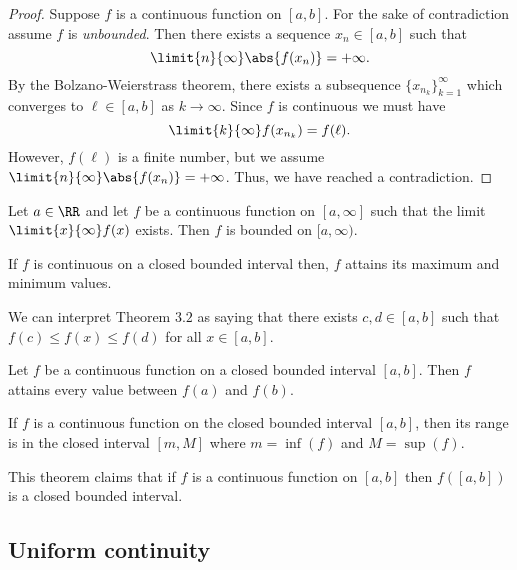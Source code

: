 \documentclass[12pt, a4paper]{article}
\begin{document}
\begin{proof}
    Suppose \(f\) is a continuous function on \([a,b]\). For the sake of contradiction assume \(f\) is \textit{unbounded}. Then there exists a sequence \(x_n \in [a,b]\) such that
    \[\limit{n}{\infty} \abs{f(x_n)} = +\infty.\]
    By the Bolzano-Weierstrass theorem, there exists a subsequence \(\{x_{n_k}\}_{k=1}^{\infty}\) which converges to \(\ell \in [a,b]\) as \(k \to \infty\). Since \(f\) is continuous we must have
    \[\limit{k}{\infty} f(x_{n_k}) =f(\ell).\]
    However, \(f(\ell)\) is a finite number, but we assume \(\limit{n}{\infty} \abs{f(x_n)} = +\infty\). Thus, we have reached a contradiction.
\end{proof}

\begin{mdcor}
    Let \(a \in \RR\) and let \(f\) be a continuous function on \([a,\infty]\) such that the limit \(\limit{x}{\infty} f(x)\) exists. Then \(f\) is bounded on \([a,\infty)\).
\end{mdcor}

\begin{mdthm}
    If \(f\) is continuous on a closed bounded interval then, \(f\) attains its maximum and minimum values.
\end{mdthm}

\begin{mdnote}
    We can interpret Theorem \(3.2\) as saying that there exists \(c,d\in [a,b]\) such that \(f(c) \leq f(x) \leq f(d)\) for all 
    \(x\in [a,b]\).
\end{mdnote}

\begin{mdthm}
    Let \(f\) be a continuous function on a closed bounded interval \([a,b]\). Then \(f\) attains every value between \(f(a)\) and \(f(b)\).
\end{mdthm}

\begin{corollary}
    If \(f\) is a continuous function on the closed bounded interval \([a,b]\), then its range is in the closed interval \([m,M]\) where \(m=\inf(f)\) and \(M=\sup(f)\).
\end{corollary}

\begin{mdnote}
    This theorem claims that if \(f\) is a continuous function on \([a,b]\) then \(f([a,b])\) is a closed bounded interval.
\end{mdnote}

\subsection{Uniform continuity}
\end{document}
